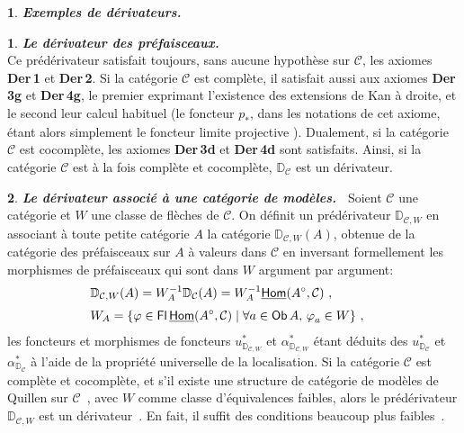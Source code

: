 \documentclass[francais]{smfart}
\theoremstyle{plain}
\theoremstyle{remark}
\theoremstyle{definition}
\newtheorem{paragr}[thm]{}
\newtheorem{subparagr}{}[thm]
\numberwithin{equation}{thm}
\begin{document}
\begin{paragr} {\emph{\textbf{{Exemples de dérivateurs}.\ }}}
\begin{subparagr} {\emph{\textbf{{Le dérivateur des préfaisceaux}.\ }}}
\[\]
Ce prédérivateur satisfait toujours, sans aucune hypothèse sur ${\mathcal{C}}$, les axiomes \textbf{Der\,1} et \textbf{Der\,2}. Si la catégorie ${\mathcal{C}}$ est complète, il satisfait aussi aux axiomes \textbf{Der\,3g} et \textbf{Der\,4g}, le premier exprimant l'existence des extensions de Kan à droite, et le second leur calcul habituel (le foncteur $p^{}_*$, dans les notations de cet axiome, étant alors simplement le foncteur limite projective ). Dualement, si la catégorie ${\mathcal{C}}$ est cocomplète, les axiomes \textbf{Der\,3d} et \textbf{Der\,4d} sont satisfaits. Ainsi, si la catégorie ${\mathcal{C}}$ est à la fois complète et cocomplète, ${\mathbb{D}}_{\mathcal{C}}$ est un dérivateur.
\end{subparagr}

\begin{subparagr} {\emph{\textbf{{Le dérivateur associé à une catégorie de modèles}.\ }}} \label{dercatmod}
Soient ${\mathcal{C}}$ une catégorie et $W$ une classe de flèches de ${\mathcal{C}}$. On définit un prédérivateur ${\mathbb{D}}_{{\mathcal{C}},W}$ en associant à toute petite catégorie $A$ la catégorie ${\mathbb{D}}_{{\mathcal{C}},W}(A)$, obtenue de la catégorie des préfaisceaux sur $A$ à valeurs dans ${\mathcal{C}}$ en inversant formellement les morphismes de préfaisceaux qui sont dans $W$ argument par argument:
\[
\begin{aligned}
&{\mathbb{D}}_{{\mathcal{C}},W}(A)=W^{-1}_A{\mathbb{D}}_{\mathcal{C}}(A)=W^{-1}_A{\operatorname{\underline{\mathsf{Hom}}}}({{{A}}^{\circ}},{\mathcal{C}}){\ },\cr
\noalign{\vskip 3pt}
&W_A=\{\varphi\in{\operatorname{\mathsf{Fl}}}\,{\operatorname{\underline{\mathsf{Hom}}}}({{{A}}^{\circ}},{\mathcal{C}})\mid\forall a\in{\operatorname{\mathsf{Ob}}}\,A,\,\varphi^{}_a\in W\}{\ },
\end{aligned}
\] 
les foncteurs et morphismes de foncteurs $u^*_{{\mathbb{D}}_{{\mathcal{C}},W}}$ et $\alpha^*_{{\mathbb{D}}_{{\mathcal{C}},W}}$ étant déduits des $u^*_{{\mathbb{D}}_{\mathcal{C}}}$ et $\alpha^*_{{\mathbb{D}}_{\mathcal{C}}}$ à l'aide de la propriété universelle de la localisation. Si la catégorie ${\mathcal{C}}$ est complète et cocomplète, et s'il existe une structure de catégorie de modèles de Quillen sur ${\mathcal{C}}$~\cite{Qu0}, avec $W$ comme classe d'équivalences faibles, alors le prédérivateur ${\mathbb{D}}_{{\mathcal{C}},W}$ est un dérivateur~\cite{CiDer}. En fait, il suffit des conditions beaucoup plus faibles~\cite{CiCatDer}.
\end{subparagr}
\end{paragr}
\end{document}
